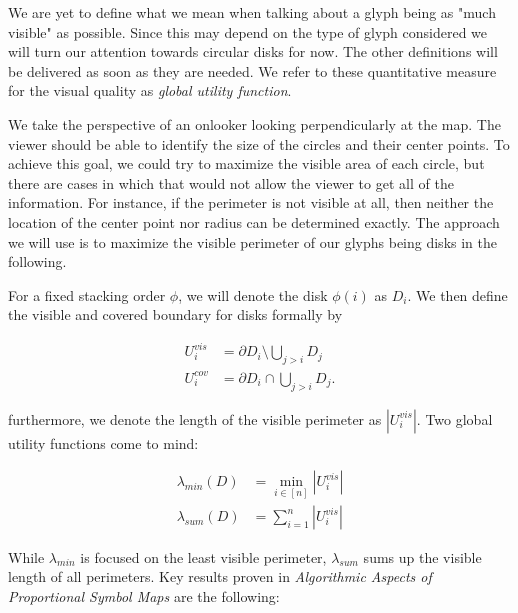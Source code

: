 \documentclass[a4paper,11pt]{article}
\begin{document}
We are yet to define what we mean when talking about a glyph being as "much visible" as possible. Since this may depend on the type of glyph considered we will turn our attention towards circular disks for now. The other definitions will be delivered as soon as they are needed. We refer to these quantitative measure for the visual quality as \textit{global utility function}.

We take the perspective of an onlooker looking perpendicularly at the map. The viewer should be able to identify the size of the circles and their center points. To achieve this goal, we could try to maximize the visible area of each circle, but there are cases in which that would not allow the viewer to get all of the information. For instance, if the perimeter is not visible at all, then neither the location of the center point nor radius can be determined exactly. The approach we will use is to maximize the visible perimeter of our glyphs being disks in the following.

\newpage

For a fixed stacking order $\phi$, we will denote the disk $\phi(i)$ as $D_i$. We then define the visible and covered boundary for disks formally by

\begin{align*}
  U_i^{vis} & =\partial D_i\setminus \bigcup_{j>i} D_{j} \\
  U_i^{cov} & =\partial D_i \cap \bigcup_{j>i} D_{j}.
\end{align*}

furthermore, we denote the length of the visible perimeter as $|U^{vis}_i|$. Two global utility functions come to mind:

\begin{align*}
  \lambda_{min} (D) & = \min_{i \in [n]}|U_i^{vis}| \\
  \lambda_{sum} (D) & = \sum_{i=1}^n|U_i^{vis}|
\end{align*}

While $\lambda_{min}$ is focused on the least visible perimeter, $\lambda_{sum}$ sums up the visible length of all perimeters. Key results proven in \textit{Algorithmic Aspects of Proportional Symbol Maps} are the following:
\end{document}
